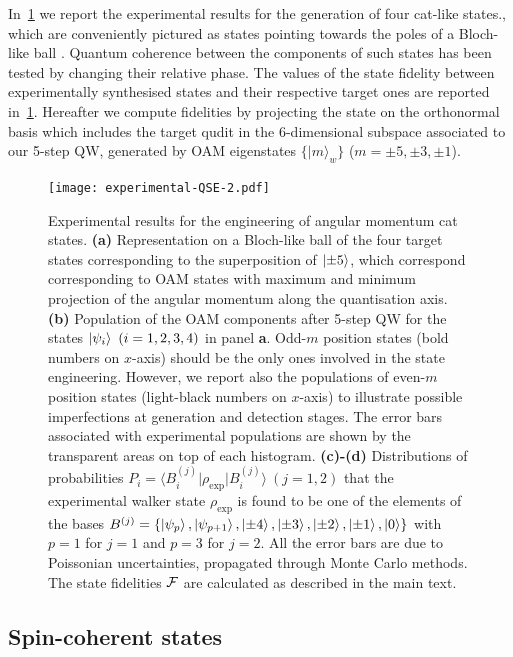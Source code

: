 In~\cref{fig:expQWs:results} we report the experimental results for the generation of four cat-like states., which are conveniently pictured as states pointing towards the poles of a Bloch-like ball . Quantum coherence between the components of such states has been tested by changing their relative phase. The values of the state fidelity between experimentally synthesised states and their respective target ones are reported in~\cref{fig:expQWs:results}. Hereafter we compute fidelities by projecting the state on the orthonormal basis which includes the target qudit in the 6-dimensional subspace associated to our 5-step \ac{QW}, generated by \ac{OAM} eigenstates $\{|m\rangle_w\}$ ($m=\pm 5, \pm 3, \pm 1$).

\begin{figure}[tb]
\texttt{[image: experimental-QSE-2.pdf]}
\caption{
	Experimental results for the engineering of angular momentum cat states.
	\textbf{(a)} Representation on a Bloch-like ball of the four target states corresponding to the superposition of $\ket{\pm 5}$, which correspond corresponding to \ac{OAM} states with maximum and minimum projection of the angular momentum along the quantisation axis.
	\textbf{(b)} Population of the \ac{OAM} components after 5-step {QW} for the states $\ket{\psi_i}~(i=1,2,3,4)$ in panel {\bf a}. Odd-$m$ position states (bold numbers on $x$-axis) should be the only ones involved in the state engineering. However, we report also the populations of even-$m$ position states (light-black numbers on $x$-axis) to illustrate possible imperfections at generation and detection stages. The error bars associated with experimental populations are shown by the transparent areas on top of each histogram.
	\textbf{(c)-(d)} Distributions of probabilities $P_i=\langle B^{(j)}_i\vert\rho_\text{exp}\vert B^{(j)}_i\rangle~(j=1,2)$ that the experimental walker state $\rho_\text{exp}$ is found to be one of the elements of the bases $B^{(j)}=\{\ket{\psi_p},\ket{\psi_{p+1}},\ket{\pm4},\ket{\pm3},\ket{\pm2},\ket{\pm1},\ket{0}\}$ with $p=1$ for $j=1$ and $p=3$ for $j=2$. All the error bars are due to Poissonian uncertainties, propagated through Monte Carlo methods. The state fidelities ${\cal F}$ are calculated as described in the main text.
}
\label{fig:expQWs:results}
\end{figure}

\subsection{Spin-coherent states}
\label{subsec:expQWs:SCSs}

